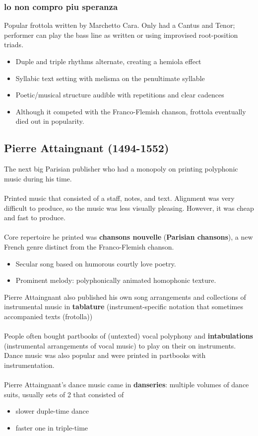 \documentclass{article}
\begin{document}
  \subsubsection{lo non compro piu speranza}
  Popular frottola written by Marchetto Cara. Only had a Cantus and Tenor; performer can play the bass line as written or using improvised root-position triads.
  \begin{itemize}
    \item Duple and triple rhythms alternate, creating a hemiola effect
    \item Syllabic text setting with melisma on the penultimate syllable
    \item Poetic/musical structure audible with repetitions and clear cadences
    \item Although it competed with the Franco-Flemish chanson, frottola eventually died out in popularity.
  \end{itemize}
  \subsection{Pierre Attaingnant (1494-1552)}
  The next big Parisian publisher who had a monopoly on printing polyphonic music during his time. \\ \\
  Printed music that consisted of a staff, notes, and text. Alignment was very difficult to produce, so the music was less visually pleasing. However, it was cheap and fast to produce. \\ \\
  Core repertoire he printed was \textbf{chansons nouvelle} (\textbf{Parisian chansons}), a new French genre distinct from the Franco-Flemish chanson.
  \begin{itemize}
    \item Secular song based on humorous courtly love poetry.
    \item Prominent melody: polyphonically animated homophonic texture.
  \end{itemize}
  Pierre Attaingnant also published his own song arrangements and collections of instrumental music in \textbf{tablature} (instrument-specific notation that sometimes accompanied texts (frotolla)) \\ \\
  People often bought partbooks of (untexted) vocal polyphony and \textbf{intabulations} (instrumental arrangements of vocal music) to play on their on instruments. Dance music was also popular and were printed in partbooks with instrumentation. \\ \\
  Pierre Attaingnant's dance music came in \textbf{danseries}: multiple volumes of dance suits, usually sets of 2 that consisted of
  \begin{itemize}
    \item slower duple-time dance
    \item faster one in triple-time
  \end{itemize}
\end{document}
